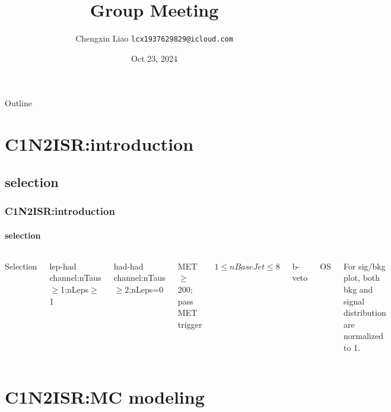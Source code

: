 \documentclass[usenames,dvipsnames]{beamer}
\title[IHEP SUSY Group Meeting]{Group Meeting}
\date[Oct 23, 2024]{Oct 23, 2024}
\author[Chengxin Liao]{
  Chengxin Liao
  \pdfnewline
  \texttt{lcx1937629829@icloud.com}
}
\institute{Department of Physics, Shandong University}
\begin{document}
\begin{frame}
\titlepage
\end{frame}

\begin{frame}{Outline}
\tableofcontents
\end{frame}

\section{C1N2ISR:introduction}
\subsection{selection}
\begin{frame}
\frametitle{C1N2ISR:introduction}
\framesubtitle{selection}
\begin{columns}
    \raggedright
    Selection

    lep-had channel:nTaus$\geq$1;nLeps$\geq$1
    
    had-had channel:nTaus$\geq$2;nLeps=0
    
    MET$\geq$ 200; pass MET trigger
    
    $1\leq nBaseJet\leq 8$
     
    b-veto
    
    OS
    \vskip 0.2cm
    
    For sig/bkg plot, both bkg and signal distribution are normalized to 1.
    
    \raggedleft
    \begin{figure}
    \includegraphics[width = 0.5\textwidth]{graphics/Feynman diagram.png}
    \end{figure}
 \end{columns}

\end{frame}

\section{C1N2ISR:MC modeling}
\end{document}
